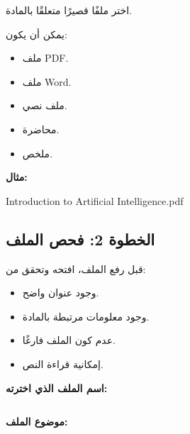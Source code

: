 \documentclass[a4paper]{article}
\begin{document}
اختر ملفًا قصيرًا متعلقًا بالمادة.

يمكن أن يكون:

\begin{itemize}

    \item ملف PDF.

    \item ملف Word.

    \item ملف نصي.

    \item محاضرة.

    \item ملخص.

\end{itemize}

\textbf{مثال:}

\begin{center}

\textenglish{Introduction to Artificial Intelligence.pdf}

\end{center}

\subsection*{\khatt الخطوة 2: فحص الملف}

قبل رفع الملف، افتحه وتحقق من:

\begin{itemize}

    \item وجود عنوان واضح.

    \item وجود معلومات مرتبطة بالمادة.

    \item عدم كون الملف فارغًا.

    \item إمكانية قراءة النص.

\end{itemize}

\textbf{اسم الملف الذي اخترته:}

\[
\boxed{\hspace{15cm}}
\]

\textbf{موضوع الملف:}

\[
\boxed{\hspace{15cm}}
\]


\end{document}
